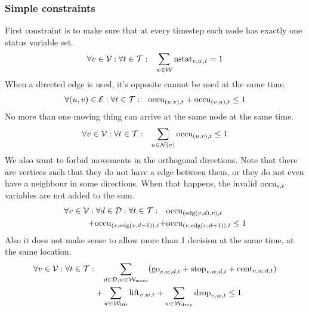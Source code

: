 \subsubsection{Simple constraints}
\label{sec:simple}
First constraint is to make sure that at every timestep each node has exactly
one status variable set.
\begin{align}
    &\forall v \in \mathcal{V}: \forall t \in \mathcal{T}: & \sum_{w \in \mathcal{W}} \mathrm{nstat}_{v,w,t} = 1
\end{align}
When a directed edge is used, it's opposite cannot be used at the same time.
\begin{align}
    &\forall (u,v) \in \mathcal{E}: \forall t \in \mathcal{T}: & \mathrm{occu}_{(u,v),t} + \mathrm{occu}_{(v,u),t}
    \leq 1
\end{align}
No more than one moving thing can arrive at the same node at the same time.
\begin{align}
    &\forall v \in \mathcal{V}: \forall t \in \mathcal{T}: & \sum_{u \in \mathcal{N}(v)} \mathrm{occu}_{(u,v),t} \leq 1
\end{align}
We also want to forbid movements in the orthogonal directions.  Note that there
are vertices such that they do not have a edge between them, or they do
not even have a neighbour in some directions. When that happens, the invalid
$\mathrm{occu}_{e,t}$ variables are not added to the sum.
\begin{equation}
    \begin{split}
        \forall v \in \mathcal{V}: \forall d \in \mathcal{D}: \forall t \in \mathcal{T}: \quad &
        \mathrm{occu}_{(\mathrm{edg}(v,d),v),t} \\ + \mathrm{occu}_{(v,\mathrm{edg}(v,d-1)),t} + &
        \mathrm{occu}_{(v,\mathrm{edg}(v,d+1)),t} \leq 1
    \end{split}
\end{equation}
Also it does not make sense to allow more than 1 decision at the same time, at
the same location.
\begin{equation}
    \begin{split}
        \forall v \in \mathcal{V}: \forall t \in \mathcal{T}: \quad & \sum_{d \in \mathcal{D}, w \in
        \mathcal{W}_\mathrm{move}}(\mathrm{go}_{v,w,d,t} + \mathrm{stop}_{v,w,d,t} + \mathrm{cont}_{v,w,d,t}) \\
        + & \sum_{w \in \mathcal{W}_\mathrm{lift}} \mathrm{lift}_{v,w,t} + \sum_{w \in \mathcal{W}_\mathrm{drop}} \mathrm{drop}_{v,w,t}
        \leq 1
    \end{split}
\end{equation}

